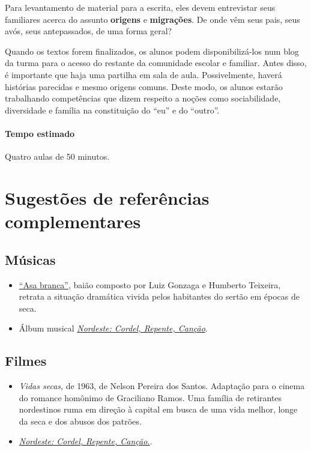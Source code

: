 \documentclass[11pt]{extarticle}
\begin{document}
Para levantamento de material para a escrita, eles devem
entrevistar seus familiares acerca do assunto \textbf{origens}
e \textbf{migrações}. De onde vêm seus pais, seus avós, seus 
antepassados, de uma forma geral? 

Quando os textos forem finalizados, os alunos podem disponibilizá-los 
num blog da turma para o acesso do restante da comunidade escolar 
e familiar. Antes disso, é importante que haja uma partilha em sala de aula.
Possivelmente, haverá histórias parecidas e mesmo origens comuns.
Deste modo, os alunos estarão trabalhando competências que dizem
respeito a noções como sociabilidade, diversidade e família na 
constituição do ``eu'' e do ``outro''.


\paragraph{Tempo estimado} Quatro aulas de 50 minutos.


\section{Sugestões de referências complementares}

\subsection{Músicas} 

\begin{itemize}
	\item \href{https://www.youtube.com/watch?v=zsFSHg2hxbc}{``Asa branca''}, baião composto por Luiz Gonzaga e Humberto Teixeira, retrata 
a situação dramática vivida pelos habitantes do sertão em épocas de seca. 

	\item Álbum musical \href{https://www.youtube.com/watch?v=wS6jzcZcc6U}{\textit{Nordeste: Cordel, Repente, Canção}}. 

\end{itemize}

\subsection{Filmes}

\begin{itemize}

	\item \textit{Vidas secas}, de 1963, de Nelson Pereira dos Santos. Adaptação para o cinema do romance homônimo
de Graciliano Ramos. Uma família de retirantes nordestinos ruma em direção à capital em busca de uma vida
melhor, longe da seca e dos abusos dos patrões. 

	\item \href{https://www.youtube.com/watch?v=xFOZxwBcUmo}{\textit{Nordeste: Cordel, Repente, Canção.}}.

\end{itemize}
\end{document}
